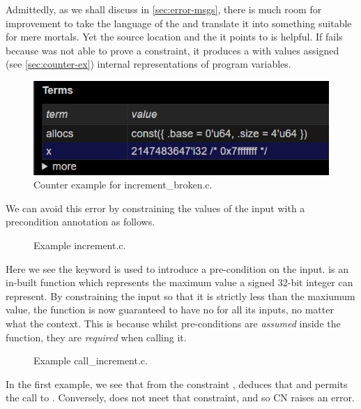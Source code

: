 Admittedly, as we shall discuss in \cref{sec:error-msgs}, there is much room
for improvement to take the language of the  and
translate it into something suitable for mere mortals. Yet the source location
and the  it points to is helpful. If  fails
because  was not able to prove a constraint, it produces a
 with values assigned (see \cref{sec:counter-ex})
internal representations of program variables.

\begin{figure}[h]
    \centering
    \includegraphics[width=.8\textwidth]{figures/increment_broken_state.png}
    \caption{Counter example for increment\_broken.c.}\label{fig:incr-broken-counter-ex}
\end{figure}

We can avoid this error by constraining the values of the input with a
precondition annotation as follows.

\begin{figure}[h]
    \centering
    \caption{Example increment.c.}\label{fig:incr}
\end{figure}

Here we see the keyword  is used to introduce a pre-condition
on the input.  is an in-built function which represents the maximum
value a signed 32-bit integer can represent. By constraining the input so that
it is strictly less than the maxiumum value, the function is now guaranteed to
have no  for all its inputs, no matter what the context. This is because
whilst pre-conditions are \emph{assumed} inside the function, they are
\emph{required} when calling it.

\begin{figure}[h]
    \centering
    \caption{Example call\_increment.c.}\label{fig:call-incr}
\end{figure}

In the first example, we see that from the constraint ,  deduces that  and permits
the call to . Conversely,  does not meet
that constraint, and so CN raises an error.

